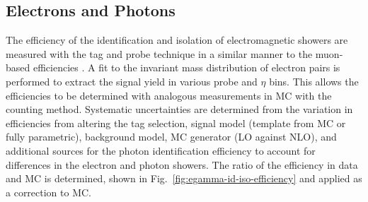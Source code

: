 \subsection{Electrons and Photons}

The efficiency of the identification and isolation of electromagnetic showers are measured with the tag and probe technique in a similar manner to the muon-based efficiencies \cite{CMS-DP-2017-004}. A fit to the invariant mass distribution of electron pairs is performed to extract the signal yield in various probe \pt and $\eta$ bins. This allows the efficiencies to be determined with analogous measurements in MC with the counting method. Systematic uncertainties are determined from the variation in efficiencies from altering the tag selection, signal model (template from MC or fully parametric), background model, MC generator (LO against NLO), and additional sources for the photon identification efficiency to account for differences in the electron and photon showers. The ratio of the efficiency in data and MC is determined, shown in Fig.~\ref{fig:egamma-id-iso-efficiency} and applied as a correction to MC.

